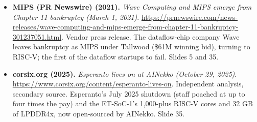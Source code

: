 \documentclass[11pt,letterpaper]{article}
\begin{document}
\begin{itemize}[leftmargin=1.2em,itemsep=3pt]
\item \textbf{MIPS (PR Newswire) (2021).} \textit{Wave Computing and MIPS emerge from Chapter 11 bankruptcy (March 1, 2021)}. \url{https://prnewswire.com/news-releases/wave-computing-and-mips-emerge-from-chapter-11-bankruptcy-301237051.html}. Vendor press release. The dataflow-chip company Wave leaves bankruptcy as MIPS under Tallwood (\$61M winning bid), turning to RISC-V; the first of the dataflow startups to fail. Slides 5 and 35.
\item \textbf{corsix.org (2025).} \textit{Esperanto lives on at AINekko (October 29, 2025)}. \url{https://www.corsix.org/content/esperanto-lives-on}. Independent analysis, secondary source. Esperanto's July 2025 shutdown (staff poached at up to four times the pay) and the ET-SoC-1's 1,000-plus RISC-V cores and 32 GB of LPDDR4x, now open-sourced by AINekko. Slide 35.
\end{itemize}
\clearpage
\printindex
\end{document}
